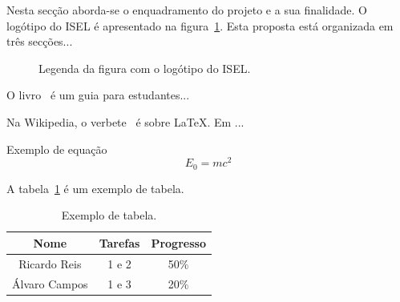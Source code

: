 Nesta secção aborda-se o enquadramento do projeto e a sua finalidade. O logótipo do ISEL é apresentado na figura~\ref{fig:logotipo}. Esta proposta está organizada em três secções...

\begin{figure}[h]
    \begin{center}
    \end{center}
    \caption{Legenda da figura com o logótipo do ISEL.}\label{fig:logotipo}
\end{figure}

O livro~\cite{dawson2015projects} é um guia para estudantes...

Na Wikipedia, o verbete~\cite{enwiki:1136305432} é sobre \LaTeX. Em \cite{6547630} ...


Exemplo de equação
\begin{equation}
    E_0 = mc^2
\end{equation}

A tabela~\ref{tab:ex1} é um exemplo de tabela.

\begin{table}
    \begin{center}
        \begin{tabular}{ccc}
            \hline
            Nome          & Tarefas & Progresso \\
            \hline
            Ricardo Reis  & 1 e 2   & 50\%      \\
            Álvaro Campos & 1 e 3   & 20\%      \\
            \hline
        \end{tabular}
        \caption{Exemplo de tabela.} \label{tab:ex1}
    \end{center}
\end{table}
